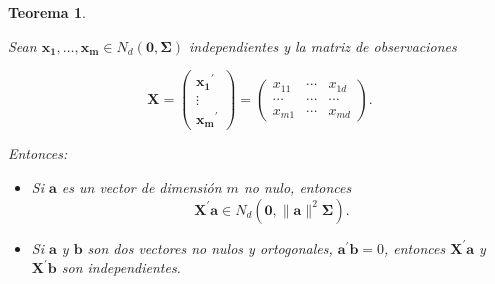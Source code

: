 \documentclass[
  a4paper,
  oneside]{scrbook}
\newtheorem{theorem}{Teorema}[chapter]
\theoremstyle{definition}
\theoremstyle{definition}
\theoremstyle{definition}
\theoremstyle{definition}
\theoremstyle{remark}
\begin{document}
\begin{theorem}
\protect\hypertarget{thm:tc}{}\label{thm:tc}

Sean \(\bm{x_1},\ldots,\bm{x_m}\in N_d(\bm{0},\bm\Sigma)\) independientes y la
matriz de observaciones

\[\bm{X}=\left(\begin{array}{c} \bm{x_1}^\prime{} \\ \vdots \\ \bm{x_m}^\prime{}\end{array}\right)
=\left(\begin{array}{ccc} x_{11} & \cdots & x_{1d} \\
\cdots & \cdots & \cdots \\
x_{m1} & \cdots & x_{md} \end{array}\right).\]

Entonces:

\begin{itemize}
\item
  Si \(\bm{a}\) es un vector de dimensión \(m\) no nulo, entonces
  \[\bm{X}^\prime{}\bm{a}\in N_d\left(\bm{0},\|\bm{a}\|^2\bm\Sigma\right).\]
\item
  Si \(\bm{a}\) y \(\bm{b}\) son dos vectores no nulos y ortogonales,
  \(\bm{a}^\prime{}\bm{b}=0\), entonces \(\bm{X}^\prime{}\bm{a}\) y
  \(\bm{X}^\prime{}\bm{b}\) son independientes.
\end{itemize}

\end{theorem}
\end{document}
